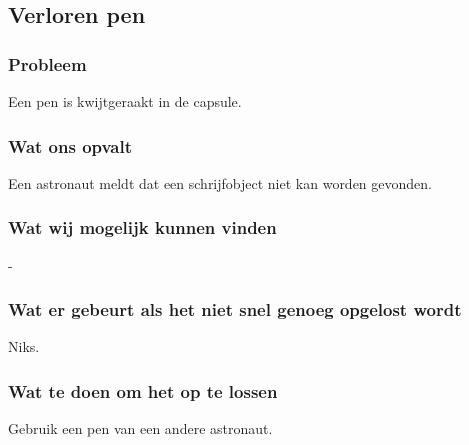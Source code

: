 \subsection{Verloren pen}

\subsubsection{Probleem}
Een pen is kwijtgeraakt in de capsule.

\subsubsection{Wat ons opvalt}
Een astronaut meldt dat een schrijfobject niet kan worden gevonden.

\subsubsection{Wat wij mogelijk kunnen vinden}
-

\subsubsection{Wat er gebeurt als het niet snel genoeg opgelost wordt}
Niks.

\subsubsection{Wat te doen om het op te lossen}
Gebruik een pen van een andere astronaut.